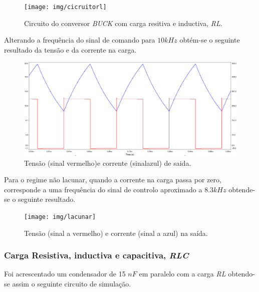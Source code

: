 \documentclass[a4paper,11pt]{article}
\numberwithin{equation}{section}
\begin{document}
\begin{figure}[h]
	\centering
	\texttt{[image: img/cicruitorl]}
	\caption{Circuito do conversor \textit{BUCK} com carga resitiva e inductiva, \textit{RL}.}
	\label{fig:circuit_5}
	\vspace{-0.8em}
\end{figure}

Alterando a frequência do sinal de comando para $10kHz$ obtém-se o seguinte resultado da tensão e da corrente na carga.



\begin{figure}[h]
	\centering
	\includegraphics[keepaspectratio=true, scale=0.3]{img/circuito6}
	\caption{Tensão (sinal vermelho)e corrente (sinalazul) de saida.}
	\label{fig:circuit_6}
	\vspace{-0.8em}
\end{figure}

Para o regime não lacunar, quando a corrente na carga passa por zero, corresponde a uma frequência do sinal de controlo aproximado a $8.3kHz$ obtende-se o seguinte resultado.


\begin{figure}[h]
	\centering
	\texttt{[image: img/lacunar]}
	\caption{Tensão (sinal a vermelho) e corrente (sinal a azul) na saída.}
	\label{fig:circuit_7}
	\vspace{-0.8em}
\end{figure}


\pagebreak
\subsubsection{Carga Resistiva, inductiva e capacitiva, \textit{RLC}}

Foi acrescentado um condensador de 15 $nF$ em paralelo com a carga \textit{RL}  obtendo-se assim o seguinte circuito de simulação.
\end{document}
